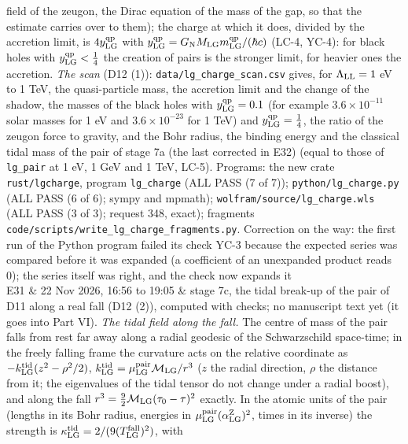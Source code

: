 \documentclass[
  10pt,
]{article}
\begin{document}
\begin{longtable}[]
field of the zeugon, the Dirac equation of the mass of the gap, so that
the estimate carries over to them); the charge at which it does, divided
by the accretion limit, is \(4y^{\rm qp}_{\rm LG}\) with
\(y^{\rm qp}_{\rm LG}=G_{\rm N}M_{\rm LG}m^{\rm qp}_{\rm LG}/(\hbar c)\)
(LC-4, YC-4): for black holes with \(y^{\rm qp}_{\rm LG}<\tfrac14\) the
creation of pairs is the stronger limit, for heavier ones the accretion.
\emph{The scan} (D12 (1)): \texttt{data/lg\_charge\_scan.csv} gives, for
\(\Lambda_{\rm LL}=1\) eV to 1 TeV, the quasi-particle mass, the
accretion limit and the change of the shadow, the masses of the black
holes with \(y^{\rm qp}_{\rm LG}=0.1\) (for example
\(3.6\times10^{-11}\) solar masses for 1 eV and \(3.6\times10^{-23}\)
for 1 TeV) and \(y^{\rm qp}_{\rm LG}=\tfrac14\), the ratio of the zeugon
force to gravity, and the Bohr radius, the binding energy and the
classical tidal mass of the pair of stage 7a (the last corrected in E32)
(equal to those of \texttt{lg\_pair} at 1 eV, 1 GeV and 1 TeV, LC-5).
Programs: the new crate \texttt{rust/lgcharge}, program
\texttt{lg\_charge} (ALL PASS (7 of 7)); \texttt{python/lg\_charge.py}
(ALL PASS (6 of 6); sympy and mpmath);
\texttt{wolfram/source/lg\_charge.wls} (ALL PASS (3 of 3); request 348,
exact); fragments \texttt{code/scripts/write\_lg\_charge\_fragments.py}.
Correction on the way: the first run of the Python program failed its
check YC-3 because the expected series was compared before it was
expanded (a coefficient of an unexpanded product reads 0); the series
itself was right, and the check now expands it \\
E31 & 22 Nov 2026, 16:56 to 19:05 & stage 7c, the tidal break-up of the
pair of D11 along a real fall (D12 (2)), computed with checks; no
manuscript text yet (it goes into Part VI). \emph{The tidal field along
the fall.} The centre of mass of the pair falls from rest far away along
a radial geodesic of the Schwarzschild space-time; in the freely falling
frame the curvature acts on the relative coordinate as
\(-k^{\rm tid}_{\rm LG}(z^2-\rho^2/2)\),
\(k^{\rm tid}_{\rm LG}=\mu^{\rm pair}_{\rm LG}\mathcal M_{\rm LG}/r^3\)
(\(z\) the radial direction, \(\rho\) the distance from it; the
eigenvalues of the tidal tensor do not change under a radial boost), and
along the fall \(r^3=\tfrac92\mathcal M_{\rm LG}(\tau_0-\tau)^2\)
exactly. In the atomic units of the pair (lengths in its Bohr radius,
energies in \(\mu^{\rm pair}_{\rm LG}(\alpha^{\rm Z}_{\rm LG})^2\),
times in its inverse) the strength is
\(\kappa^{\rm tid}_{\rm LG}=2/(9(T^{\rm fall}_{\rm LG})^2)\), with

\end{longtable}
\end{document}
